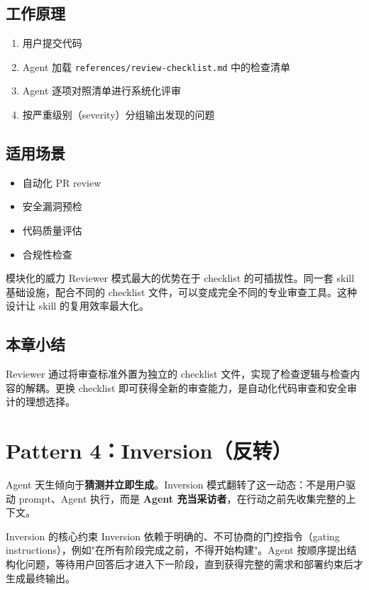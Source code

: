 \documentclass[a4paper]{article}
\begin{document}
\subsection{工作原理}

\begin{enumerate}
    \item 用户提交代码
    \item Agent 加载 \texttt{references/review-checklist.md} 中的检查清单
    \item Agent 逐项对照清单进行系统化评审
    \item 按严重级别（severity）分组输出发现的问题
\end{enumerate}

\subsection{适用场景}

\begin{itemize}
    \item 自动化 PR review
    \item 安全漏洞预检
    \item 代码质量评估
    \item 合规性检查
\end{itemize}

\begin{knowledgebox}{模块化的威力}
Reviewer 模式最大的优势在于 checklist 的可插拔性。同一套 skill 基础设施，配合不同的 checklist 文件，可以变成完全不同的专业审查工具。这种设计让 skill 的复用效率最大化。
\end{knowledgebox}

\subsection{本章小结}

Reviewer 通过将审查标准外置为独立的 checklist 文件，实现了检查逻辑与检查内容的解耦。更换 checklist 即可获得全新的审查能力，是自动化代码审查和安全审计的理想选择。

\section{Pattern 4：Inversion（反转）}

Agent 天生倾向于\textbf{猜测并立即生成}。Inversion 模式翻转了这一动态：不是用户驱动 prompt、Agent 执行，而是 \textbf{Agent 充当采访者}，在行动之前先收集完整的上下文。

\begin{importantbox}{Inversion 的核心约束}
Inversion 依赖于明确的、不可协商的门控指令（gating instructions），例如"在所有阶段完成之前，不得开始构建"。Agent 按顺序提出结构化问题，等待用户回答后才进入下一阶段，直到获得完整的需求和部署约束后才生成最终输出。
\end{importantbox}
\end{document}
